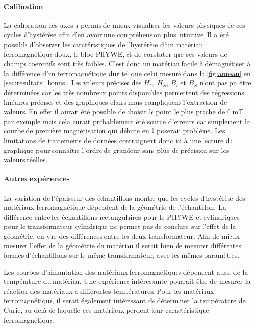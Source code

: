 \paragraph*{Calibration}
La calibration des axes a permis de mieux visualiser les valeurs physiques de ces cycles d'hystérèse afin d'en avoir une compréhension plus intuitive. Il a été possible d'observer les carctéristiques de l'hystérèse d'un matériau ferromagnétique doux, le bloc PHYWE, et de constater que ses valeurs de champs coercitifs sont très faibles. C'est donc un matériau facile à démagnétiser à la différence d'un ferromagnétique dur tel que celui mesuré dans la \autoref{fig:anneau} en \autoref{sec:resultats_bonus}. Les valeurs précises des \(H_C\), \(H_S\), \(B_r\) et \(B_S\) n'ont pas pu être déterminées car les très nombreux points disponibles permettent des régressions linéaires précises et des graphiques clairs mais compliquent l'extraction de valeurs. En effet il aurait été possible de choisir le point le plus proche de 0 \si{\milli\tesla} par exemple mais cela aurait probablement été source d'erreurs car simplement la courbe de première magnétisation qui débute en 0 poserait problème. Les limitations de traitements de données contraignent donc ici à une lecture du graphique pour connaître l'ordre de grandeur sans plus de précision sur les valeurs réelles.

\paragraph*{Autres expériences}
La variation de l'épaisseur des échantillons montre que les cycles d'hystérèse des matériaux ferromagnétique dépendent de la géométrie de l'échantillon. La différence entre les échantillons rectangulaires pour le PHYWE et cylindriques pour le transformateur cylindrique ne permet pas de conclure sur l'effet de la géométrie, en vue des différences entre les deux transformateur. Afin de mieux mesurer l'effet de la géométrie du matériau il serait bien de mesurer différentes formes d'échantillons sur le même transformateur, avec les mêmes paramètres.

Les courbes d'aimantation des matériaux ferromagnétiques dépendent aussi de la température du matériau. Une expérience intéressante pourrait être de mesurer la réaction des matériaux à différentes températures. Pour les matériaux ferromagnétique, il serait également intéressant de déterminer la température de Curie, au delà de laquelle ces matériaux perdent leur caractéristique ferromagnétique.

